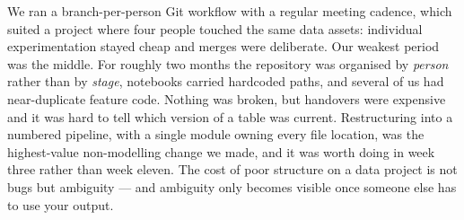 \documentclass[11pt, a4paper]{article}
\begin{document}
We ran a branch-per-person Git workflow with a regular meeting cadence, which suited a project
where four people touched the same data assets: individual experimentation stayed cheap and
merges were deliberate. Our weakest period was the middle. For roughly two months the
repository was organised by \emph{person} rather than by \emph{stage}, notebooks carried
hardcoded paths, and several of us had near-duplicate feature code. Nothing was broken, but
handovers were expensive and it was hard to tell which version of a table was current.
Restructuring into a numbered pipeline, with a single module owning every file location, was
the highest-value non-modelling change we made, and it was worth doing in week three rather
than week eleven. The cost of poor structure on a data project is not bugs but ambiguity ---
and ambiguity only becomes visible once someone else has to use your output.

\end{document}
